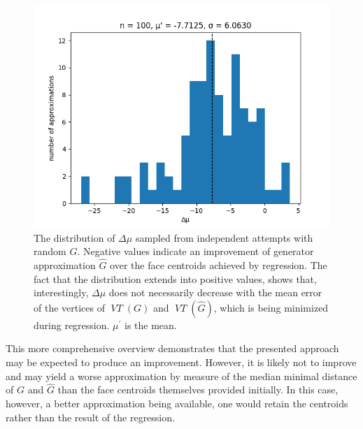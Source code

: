 \documentclass[a4paper]{article}
\DeclareMathOperator*{\VT}{\textit{VT}}
\begin{document}
\begin{figure}[H]
	\includegraphics[width=\textwidth]{approximation_improvement.png}
	\caption{The distribution of \(\Delta\mu\) sampled from independent attempts with random \(G\).
		Negative values indicate an improvement of generator approximation \(\hat{G}\) over the face centroids achieved by
		regression. The fact that the distribution extends into positive values, shows that, interestingly,
		\(\Delta\mu\) does not necessarily decrease with the mean error of the vertices of \(\VT(G)\) and
		\(\VT(\hat{G})\), which is being minimized during regression. \(\mu^\prime\) is the mean.}
\end{figure}

This more comprehensive overview demonstrates that the presented approach may be expected to produce an
improvement. However, it is likely not to improve and may yield a worse approximation by measure of the median minimal
distance of \(G\) and \(\hat{G}\) than the face centroids themselves provided initially. In this case, however, a better
approximation being available, one would retain the centroids rather than the result of the regression.
\end{document}
